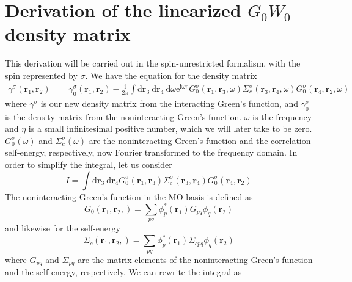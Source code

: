 \documentclass[12pt]{caltech_thesis}
\begin{document}
\chapter{Derivation of the linearized $G_0W_0$ density matrix}
This derivation will be carried out in the spin-unrestricted formalism, with the spin represented by $\sigma $.
\label{applinearized_gw}
We have the equation for the density matrix
\begin{equation}
\begin{aligned}
\gamma^\sigma\left(\mathbf{r}_1, \mathbf{r}_2\right)= & \gamma_0^\sigma\left(\mathbf{r}_1, \mathbf{r}_2\right) -\frac{\mathrm{i}}{2 \pi} \int \mathrm{d} \mathbf{r}_3 \mathrm{~d} \mathbf{r}_4 \mathrm{~d} \omega \mathrm{e}^{\mathrm{i \omega \eta}} G_0^\sigma\left(\mathbf{r}_1, \mathbf{r}_3, \omega\right) \Sigma_c^\sigma\left(\mathbf{r}_3, \mathbf{r}_4, \omega\right) G_0^\sigma\left(\mathbf{r}_4, \mathbf{r}_2, \omega\right)
\label{eqninit_dm}
\end{aligned}
\end{equation}
where $\gamma^\sigma$ is our new density matrix from the interacting Green's function, and $\gamma_0^\sigma$ is the density matrix from the noninteracting Green's function. $\omega$ is the frequency and $\eta$ is a small infinitesimal positive number, which we will later take to be zero. $G_0^\sigma(\omega)$ and $\Sigma_c^\sigma(\omega)$ are the noninteracting Green's function and the correlation self-energy, respectively, now Fourier transformed to the frequency domain.
In order to simplify the integral, let us consider
\begin{equation}
I = \int \mathrm{d} \mathbf{r}_3 \mathrm{~d} \mathbf{r}_4  G_0^\sigma\left(\mathbf{r}_1, \mathbf{r}_3\right) \Sigma_c^\sigma\left(\mathbf{r}_3, \mathbf{r}_4\right) G_0^\sigma\left(\mathbf{r}_4, \mathbf{r}_2\right)
\end{equation}
The noninteracting Green's function in the MO basis is defined as
\begin{equation}
G_0\left(\mathbf{r}_1, \mathbf{r}_2, \right) = \sum_{pq} \phi_p^*(\mathbf{r}_1) G_{p q} \phi_q(\mathbf{r}_2)
\end{equation}
and likewise for the self-energy
\begin{equation}
\Sigma_c\left(\mathbf{r}_1, \mathbf{r}_2, \right) = \sum_{pq} \phi_p^*(\mathbf{r}_1) \Sigma_{c pq} \phi_q(\mathbf{r}_2)
\end{equation}
where $G_{p q}$ and $\Sigma_{p q}$ are the matrix elements of the noninteracting Green's function and the self-energy, respectively. We can rewrite the integral as
\end{document}
